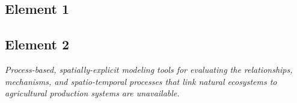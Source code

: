\subsection{Element 1}
\begin{comment}
\textit{A typology of soil microbe communities is required for evaluating the functional capacity of soil foodwebs. The typology must be capable of integrating field data from both in situ optical microscopy and modern genomics.} \\


for (a) evaluation of the functional capacity of soil foodweb dynamics, (b) evaluation of the productivity, diversity and composition of plant communities in relation to nature and extent of the aboveground to belowground linkages, (c) readily obtainable metrics that provide indicator metrics


\begin{outline}[enumerate]
\1 current typologies
\2 Functionally (ie using an ecological typology) 
\2 Taxonomically  (ie using monophyletic, paraphyletic, or polyphyletic designators)
\2 Spatially (with reference to soil horizons OR the rhizosphere OR both)
\1 soil fertility == a vector of measurements on soil structure and soil chemistry. soil structure a fxn of soil microbes
\1 numbers of genera, spp in soil
\1 use of chronosequences
\1
\end{outline}
\end{comment}

\subsection{Element 2}
\textit{Process-based, spatially-explicit modeling tools for evaluating the relationships, mechanisms, and spatio-temporal processes that link natural ecosystems to agricultural production systems are unavailable.} \\

